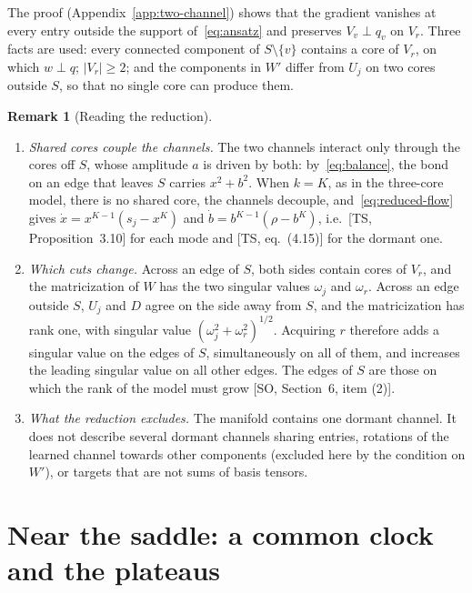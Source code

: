 \documentclass[11pt]{article}
\newcommand{\TS}{\textsf{TS}}
\newcommand{\SO}{\textsf{SO}}
\newcommand{\ts}[1]{[\TS, #1]}
\newcommand{\so}[1]{[\SO, #1]}
\theoremstyle{definition}
\newtheorem{remark}[theorem]{Remark}
\numberwithin{equation}{section}
\begin{document}
The proof (Appendix~\ref{app:two-channel}) shows that the gradient vanishes at every entry outside the support of~\eqref{eq:ansatz} and preserves $V_v\perp q_v$ on $V_r$. Three facts are used: every connected component of $S\setminus\{v\}$ contains a core of $V_r$, on which $w\perp q$; $|V_r|\ge2$; and the components in $W'$ differ from $U_j$ on two cores outside $S$, so that no single core can produce them.

\begin{remark}[Reading the reduction]\label{rem:reading}
\leavevmode
\begin{enumerate}[label=(\roman*),nosep]
\item \emph{Shared cores couple the channels.} The two channels interact only through the cores off $S$, whose amplitude $a$ is driven by both: by~\eqref{eq:balance}, the bond on an edge that leaves $S$ carries $x^2+b^2$. When $k=K$, as in the three-core model, there is no shared core, the channels decouple, and~\eqref{eq:reduced-flow} gives $\dot x=x^{K-1}(s_j-x^K)$ and $\dot b=b^{K-1}(\rho-b^K)$, i.e.\ \ts{Proposition~3.10} for each mode and \ts{eq.~(4.15)} for the dormant one.
\item \emph{Which cuts change.} Across an edge of $S$, both sides contain cores of $V_r$, and the matricization of $W$ has the two singular values $\omega_j$ and $\omega_r$. Across an edge outside $S$, $U_j$ and $D$ agree on the side away from $S$, and the matricization has rank one, with singular value $(\omega_j^2+\omega_r^2)^{1/2}$. Acquiring $r$ therefore adds a singular value on the edges of $S$, simultaneously on all of them, and increases the leading singular value on all other edges. The edges of $S$ are those on which the rank of the model must grow \so{Section~6, item (2)}.
\item \emph{What the reduction excludes.} The manifold contains one dormant channel. It does not describe several dormant channels sharing entries, rotations of the learned channel towards other components (excluded here by the condition on $W'$), or targets that are not sums of basis tensors.
\end{enumerate}
\end{remark}

\section{Near the saddle: a common clock and the plateaus}\label{sec:near}
\end{document}
